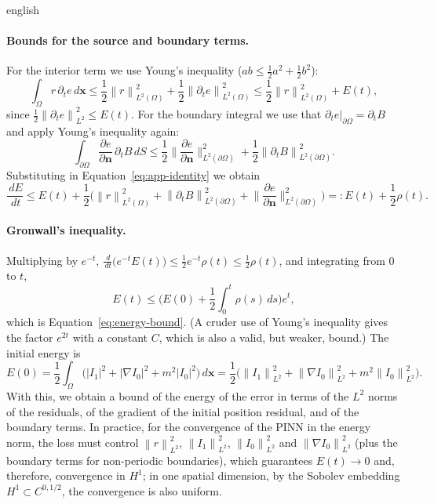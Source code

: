 \documentclass[11pt,letterpaper,twoside,openright]{book} %
\newcommand{\norm}[1]{\left\lVert #1 \right\rVert}
\newcommand{\abs}[1]{\left\lvert #1 \right\rvert}
\begin{document}
\begin{hyphenrules}{english}
\paragraph{Bounds for the source and boundary terms.}
For the interior term we use Young's inequality ($ab\le\frac12a^2+\frac12b^2$):
\[
  \int_\Omega r\,\partial_te\,d\mathbf{x}\le\frac12\norm{r}^2_{L^2(\Omega)}+\frac12\norm{\partial_te}^2_{L^2(\Omega)}
  \le\frac12\norm{r}^2_{L^2(\Omega)}+E(t),
\]
since $\frac12\norm{\partial_te}^2_{L^2}\le E(t)$. For the boundary integral we use that
$\partial_te|_{\partial\Omega}=\partial_tB$ and apply Young's inequality again:
\[
  \int_{\partial\Omega}\frac{\partial e}{\partial\mathbf{n}}\,\partial_tB\,d S
  \le\frac12\Big\|\frac{\partial e}{\partial\mathbf{n}}\Big\|^2_{L^2(\partial\Omega)}+\frac12\norm{\partial_tB}^2_{L^2(\partial\Omega)}.
\]
Substituting in Equation~\eqref{eq:app-identity} we obtain
\begin{equation}
  \frac{\,d E}{\,d t}\le E(t)+\frac12\Big(\norm{r}^2_{L^2(\Omega)}+\norm{\partial_tB}^2_{L^2(\partial\Omega)}
  +\Big\|\frac{\partial e}{\partial\mathbf{n}}\Big\|^2_{L^2(\partial\Omega)}\Big)=:E(t)+\frac12\rho(t).
  \label{eq:app-differential}
\end{equation}

\paragraph{Gronwall's inequality.}
Multiplying by $e^{-t}$, $\frac{\,d}{\,d t}\big(e^{-t}E(t)\big)\le\frac12e^{-t}\rho(t)\le\frac12\rho(t)$, and
integrating from $0$ to $t$,
\[
  E(t)\le\Big(E(0)+\frac12\int_0^t\rho(s)\,d s\Big)e^{t},
\]
which is Equation~\eqref{eq:energy-bound}. (A cruder use of Young's inequality gives the factor $e^{2t}$ with a constant $C$, which is also
a valid, but weaker, bound.) The initial energy is
\[
  E(0)=\frac12\int_\Omega\Big(\abs{I_1}^2+\abs{\nabla I_0}^2+m^2\abs{I_0}^2\Big)\,d\mathbf{x}
  =\frac12\Big(\norm{I_1}^2_{L^2}+\norm{\nabla I_0}^2_{L^2}+m^2\norm{I_0}^2_{L^2}\Big).
\]
With this, we obtain a bound of the energy of the error in terms of the $L^2$ norms of the residuals, of the
gradient of the initial position residual, and of the boundary terms. In practice, for the convergence of
the PINN in the energy norm, the loss must control $\norm{r}^2_{L^2}$, $\norm{I_1}^2_{L^2}$,
$\norm{I_0}^2_{L^2}$ and $\norm{\nabla I_0}^2_{L^2}$ (plus the boundary terms for non-periodic boundaries),
which guarantees $E(t)\to0$ and, therefore, convergence in $H^1$; in one spatial dimension, by the Sobolev
embedding $H^1\subset C^{0,1/2}$, the convergence is also uniform.


\end{hyphenrules}
\end{document}
